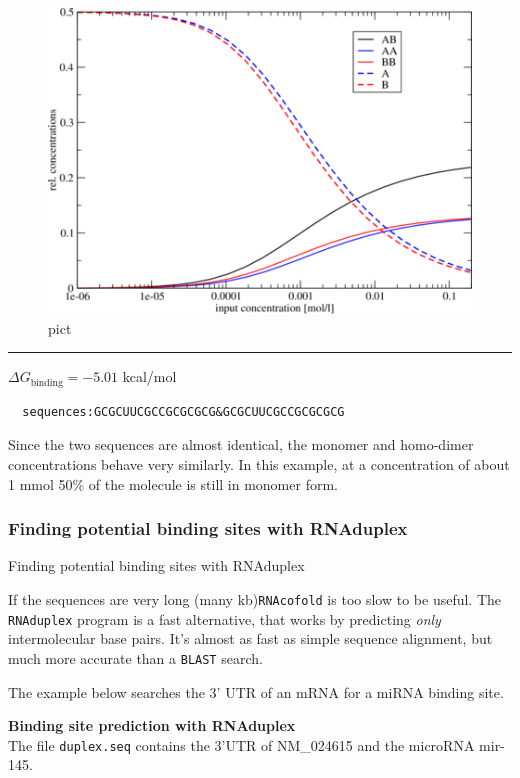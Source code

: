 \documentclass[]{article}
\begin{document}
\begin{figure}[htbp]
\centering
\includegraphics{Figs/tconcdep.png}
\caption{pict}
\end{figure}

\begin{center}\rule{0.5\linewidth}{\linethickness}\end{center}

\(\Delta G_{\text{binding}} = - 5.01\) kcal/mol

\begin{verbatim}
  sequences:GCGCUUCGCCGCGCGCG&GCGCUUCGCCGCGCGCG
\end{verbatim}

Since the two sequences are almost identical, the monomer and homo-dimer
concentrations behave very similarly. In this example, at a
concentration of about 1 mmol 50\% of the molecule is still in monomer
form.

\subsubsection{Finding potential binding sites with RNAduplex}{Finding potential binding sites with RNAduplex}\label{finding-potential-binding-sites-with-rnaduplex}

If the sequences are very long (many kb)\texttt{RNAcofold} is too slow
to be useful. The \texttt{RNAduplex} program is a fast alternative, that
works by predicting \emph{only} intermolecular base pairs. It's almost
as fast as simple sequence alignment, but much more accurate than a
\texttt{BLAST} search.

The example below searches the 3' UTR of an mRNA for a miRNA binding
site.

\textbf{Binding site prediction with RNAduplex}\\
 The file \texttt{duplex.seq} contains the 3'UTR of NM\_024615 and the
microRNA mir-145.
\end{document}
